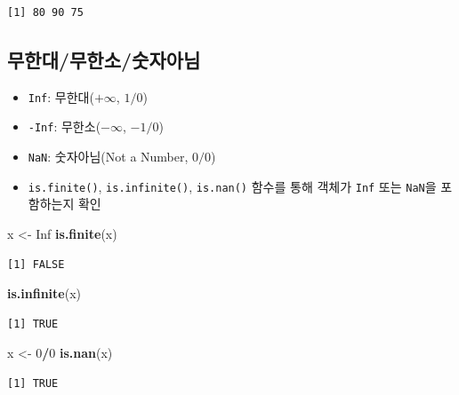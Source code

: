\documentclass[
  11pt,
]{krantz}
\newenvironment{Shaded}{\begin{snugshade}}{\end{snugshade}}
\newcommand{\DecValTok}[1]{\textcolor[rgb]{0.06,0.06,0.06}{#1}}
\newcommand{\KeywordTok}[1]{\textcolor[rgb]{0.27,0.27,0.27}{\textbf{#1}}}
\newcommand{\NormalTok}[1]{#1}
\newcommand{\OperatorTok}[1]{\textcolor[rgb]{0.43,0.43,0.43}{\textbf{#1}}}
\newcommand{\OtherTok}[1]{\textcolor[rgb]{0.37,0.37,0.37}{#1}}
\newcommand{\StringTok}[1]{\textcolor[rgb]{0.5,0.5,0.5}{#1}}
\providecommand{\tightlist}{%
  \setlength{\itemsep}{0pt}\setlength{\parskip}{0pt}}
\begin{document}
\begin{verbatim}
[1] 80 90 75
\end{verbatim}

\normalsize

\hypertarget{finite}{%
\subsection{무한대/무한소/숫자아님}\label{finite}}

\begin{itemize}
\tightlist
\item
  \texttt{Inf}: 무한대(\(+\infty\), \(1/0\))
\item
  \texttt{-Inf}: 무한소(\(-\infty\), \(-1/0\))
\item
  \texttt{NaN}: 숫자아님(Not a Number, \(0/0\))
\item
  \texttt{is.finite()}, \texttt{is.infinite()}, \texttt{is.nan()} 함수를 통해 객체가 \texttt{Inf} 또는 \texttt{NaN}을 포함하는지 확인
\end{itemize}

\footnotesize

\begin{Shaded}
\begin{Highlighting}[]
\NormalTok{x <-}\StringTok{ }\OtherTok{Inf}
\KeywordTok{is.finite}\NormalTok{(x)}
\end{Highlighting}
\end{Shaded}

\begin{verbatim}
[1] FALSE
\end{verbatim}

\begin{Shaded}
\begin{Highlighting}[]
\KeywordTok{is.infinite}\NormalTok{(x)}
\end{Highlighting}
\end{Shaded}

\begin{verbatim}
[1] TRUE
\end{verbatim}

\begin{Shaded}
\begin{Highlighting}[]
\NormalTok{x <-}\StringTok{ }\DecValTok{0}\OperatorTok{/}\DecValTok{0}
\KeywordTok{is.nan}\NormalTok{(x)}
\end{Highlighting}
\end{Shaded}

\begin{verbatim}
[1] TRUE
\end{verbatim}
\end{document}
